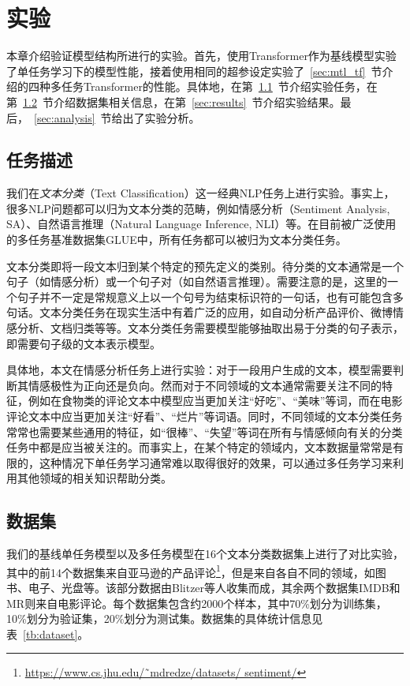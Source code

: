 \chapter{实验}
\label{cha:exp}
本章介绍验证模型结构所进行的实验。首先，使用Transformer作为基线模型实验了单任务学习下的模型性能，接着使用相同的超参设定实验了~\ref{sec:mtl_tf}~节介绍的四种多任务Transformer的性能。具体地，在第~\ref{sec:task}~节介绍实验任务，在第~\ref{sec:ds}~节介绍数据集相关信息，在第~\ref{sec:results}~节介绍实验结果。最后，~\ref{sec:analysis}~节给出了实验分析。

\section{任务描述}
\label{sec:task}
我们在\emph{文本分类}（Text Classification）这一经典NLP任务上进行实验。事实上，很多NLP问题都可以归为文本分类的范畴，例如情感分析（Sentiment Analysis, SA）、自然语言推理（Natural Language Inference, NLI）等。在目前被广泛使用的多任务基准数据集GLUE\cite{DBLP:conf/emnlp/WangSMHLB18}中，所有任务都可以被归为文本分类任务。

文本分类即将一段文本归到某个特定的预先定义的类别。待分类的文本通常是一个句子（如情感分析）或一个句子对（如自然语言推理）。需要注意的是，这里的一个句子并不一定是常规意义上以一个句号为结束标识符的一句话，也有可能包含多句话。文本分类任务在现实生活中有着广泛的应用，如自动分析产品评价、微博情感分析、文档归类等等。文本分类任务需要模型能够抽取出易于分类的句子表示，即需要句子级的文本表示模型。

具体地，本文在情感分析任务上进行实验：对于一段用户生成的文本，模型需要判断其情感极性为正向还是负向。然而对于不同领域的文本通常需要关注不同的特征，例如在食物类的评论文本中模型应当更加关注“好吃”、“美味”等词，而在电影评论文本中应当更加关注“好看”、“烂片”等词语。同时，不同领域的文本分类任务常常也需要某些通用的特征，如“很棒”、“失望”等词在所有与情感倾向有关的分类任务中都是应当被关注的。而事实上，在某个特定的领域内，文本数据量常常是有限的，这种情况下单任务学习通常难以取得很好的效果，可以通过多任务学习来利用其他领域的相关知识帮助分类。

\section{数据集}
\label{sec:ds}
我们的基线单任务模型以及多任务模型在16个文本分类数据集上进行了对比实验，其中的前14个数据集来自亚马逊的产品评论\footnote{\url{https://www.cs.jhu.edu/˜mdredze/datasets/ sentiment/}}，但是来自各自不同的领域，如图书、电子、光盘等。该部分数据由Blitzer等人\cite{DBLP:conf/acl/BlitzerDP07}收集而成，其余两个数据集IMDB\cite{DBLP:conf/acl/MaasDPHNP11}和MR\cite{DBLP:conf/acl/PangL05}则来自电影评论。每个数据集包含约2000个样本，其中70\%划分为训练集，10\%划分为验证集，20\%划分为测试集。数据集的具体统计信息见表~\ref{tb:dataset}。

